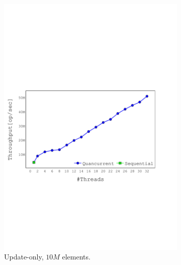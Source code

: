 \begin{figure}[h] %
\centering
    \begin{subfigure}[]{0.49\textwidth}
        \centering
        \includegraphics[width=\textwidth,trim={0cm 7cm 1.9cm 10cm},clip] {graphics/graphs/throughput/oracle_Quancurrent_blocking_numa_update_k4096_b16_keys10M_Tup32_runs15_16-08-2022_05-29-07_flat.pdf}
        \caption{Update-only, $10M$ elements.}
        \label{fig:update_only_speedup}
    \end{subfigure}
    \begin{subfigure}[]{0.49\textwidth}
        \centering

\end{subfigure}
\end{figure}

